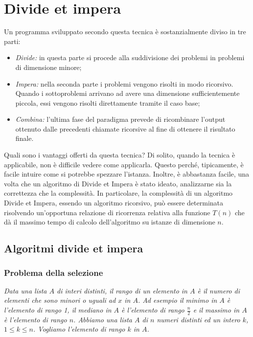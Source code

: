 \chapter{Divide et impera}
\begin{redbar}
Un programma sviluppato secondo questa tecnica è sostanzialmente diviso in tre parti:
\begin{itemize}
    \item \textit{Divide:} in questa parte si procede alla suddivisione dei problemi in problemi di dimensione minore;
    \item \textit{Impera:} nella seconda parte i problemi vengono risolti in modo ricorsivo. Quando i sottoproblemi arrivano ad avere una dimensione sufficientemente piccola, essi vengono risolti direttamente tramite il caso base; 
    \item \textit{Combina:} l'ultima fase del paradigma prevede di ricombinare l'output ottenuto dalle precedenti chiamate ricorsive al fine di ottenere il risultato finale.
\end{itemize}
\end{redbar}

Quali sono i vantaggi offerti da questa tecnica? Di solito, quando la tecnica è applicabile, non è difficile vedere come applicarla. Questo perché, tipicamente, è facile intuire come si potrebbe spezzare l'istanza. Inoltre, è abbastanza facile, una volta che un algoritmo di Divide et Impera è stato ideato, analizzarne sia la correttezza che la complessità. In particolare, la complessità di un algoritmo Divide et Impera, essendo un algoritmo ricorsivo, può essere determinata risolvendo un'opportuna relazione di ricorrenza relativa alla funzione $T(n)$ che dà il massimo tempo di calcolo dell'algoritmo su istanze di dimensione $n$.

\section{Algoritmi divide et impera}
\subsection{Problema della selezione}
\textit{Data una lista $A$ di interi distinti, il rango di un elemento in $A$ è il numero di elementi che sono minori o uguali ad $x$ in $A$. Ad esempio il minimo in $A$ è l'elemento di rango 1, il mediano in $A$ è l'elemento di rango $\frac{n}{2}$ e il massimo in $A$ è l'elemento di rango $n$.
Abbiamo una lista $A$ di $n$ numeri distinti ed un intero $k$, $1\leq k \leq n$. Vogliamo l'elemento di rango $k$ in $A$.}

